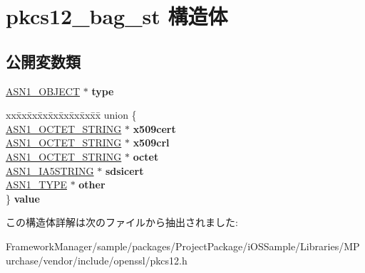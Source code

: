 \hypertarget{structpkcs12__bag__st}{}\section{pkcs12\+\_\+bag\+\_\+st 構造体}
\label{structpkcs12__bag__st}
\subsection*{公開変数類}
\begin{DoxyCompactItemize}
\item 
\hypertarget{structpkcs12__bag__st_a6f70869478b661dce62ea8f340d15086}{}\hyperlink{structasn1__object__st}{A\+S\+N1\+\_\+\+O\+B\+J\+E\+C\+T} $\ast$ {\bfseries type}\label{structpkcs12__bag__st_a6f70869478b661dce62ea8f340d15086}

\item 
\hypertarget{structpkcs12__bag__st_a553272749e5cb0c9e8aca7917877b682}{}\begin{tabbing}
xx\=xx\=xx\=xx\=xx\=xx\=xx\=xx\=xx\=\kill
union \{\\
\>\hyperlink{structasn1__string__st}{ASN1\_OCTET\_STRING} $\ast$ {\bfseries x509cert}\\
\>\hyperlink{structasn1__string__st}{ASN1\_OCTET\_STRING} $\ast$ {\bfseries x509crl}\\
\>\hyperlink{structasn1__string__st}{ASN1\_OCTET\_STRING} $\ast$ {\bfseries octet}\\
\>\hyperlink{structasn1__string__st}{ASN1\_IA5STRING} $\ast$ {\bfseries sdsicert}\\
\>\hyperlink{structasn1__type__st}{ASN1\_TYPE} $\ast$ {\bfseries other}\\
\} {\bfseries value}\label{structpkcs12__bag__st_a553272749e5cb0c9e8aca7917877b682}
\\

\end{tabbing}\end{DoxyCompactItemize}


この構造体詳解は次のファイルから抽出されました\+:\begin{DoxyCompactItemize}
\item 
Framework\+Manager/sample/packages/\+Project\+Package/i\+O\+S\+Sample/\+Libraries/\+M\+Purchase/vendor/include/openssl/pkcs12.\+h\end{DoxyCompactItemize}
